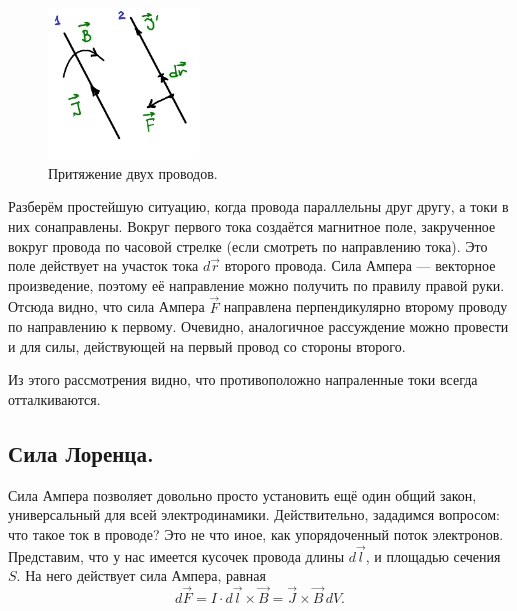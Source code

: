 \documentclass[11pt,a4paper]{article}
\numberwithin{equation}{section}
\begin{document}
\begin{figure}
  \vspace{-1cm}
  \begin{center}
  \includegraphics[width=4cm]{2wires.pdf}  
  \end{center}
  \vspace{-1cm}
  \caption{Притяжение двух проводов.}
  \label{fig:2wires}
  \vspace{-0.8cm}
\end{figure}

Разберём простейшую ситуацию, когда провода параллельны друг другу, а
токи в них сонаправлены. Вокруг первого тока создаётся магнитное поле,
закрученное вокруг провода по часовой стрелке (если смотреть по
направлению тока). Это поле действует на участок тока $d\vec{r}$
второго провода. Сила Ампера --- векторное произведение, поэтому её
направление можно получить по правилу правой руки. Отсюда видно, что
сила Ампера $\vec{F}$ направлена перпендикулярно второму проводу по
направлению к первому. Очевидно, аналогичное рассуждение можно
провести и для силы, действующей на первый провод со стороны второго.

Из этого рассмотрения видно, что противоположно напраленные токи
всегда отталкиваются. 

\subsection{Сила Лоренца.}
\label{sec:lorentz_force}

Сила Ампера позволяет довольно просто установить ещё один общий закон,
универсальный для всей электродинамики. Действительно, зададимся
вопросом: что такое ток в проводе? Это не что иное, как упорядоченный
поток электронов. Представим, что у нас имеется кусочек провода длины
$d\vec{l}$, и площадью сечения $S$. На него действует сила Ампера,
равная
\begin{equation}
  \label{eq:der_lorentz_force_1}
  d\vec{F} = I \cdot d\vec{l} \times \vec{B} = \vec{J} \times \vec{B}\, dV.
\end{equation}
\end{document}
